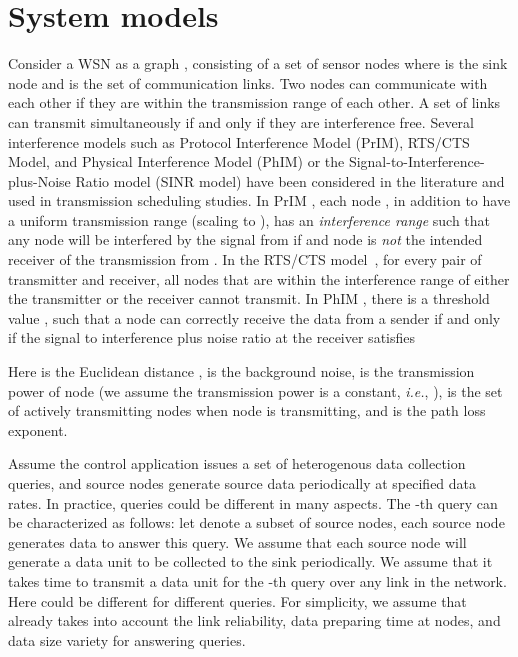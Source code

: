\documentclass[conference,10pt]{IEEEtran}\usepackage{amsmath}
\def\ie{\textit{i.e.}\xspace}
\begin{document}
\section{System models}
\label{sec:model}
Consider a WSN as a graph , consisting of a set  of 
 sensor nodes
 where  is the sink node and  is the set of
 communication links.
Two nodes can communicate with each other {if}
 they are within the transmission range of each other.
A set of links can transmit simultaneously if and only if they are
 interference free.
 Several interference models such as Protocol Interference Model (PrIM),  RTS/CTS Model, and Physical
 Interference Model (PhIM) or the Signal-to-Interference-plus-Noise
 Ratio model (SINR model) have been considered in the literature and used in transmission
scheduling studies.
In PrIM \cite{gupta2000capacity}, each node
 , in addition to have a uniform transmission range (scaling to ),
 has an \textit{interference range}  such that
 any node  will be interfered by the signal from
  if  and node  is \emph{not}
 the intended receiver of the transmission from .
In the RTS/CTS  model~\cite{alicherry2005joint}, for every
 pair of transmitter and receiver,
 all nodes that are within the interference range of either the transmitter
 or the receiver cannot transmit.
In PhIM \cite{goussevskaia2007complexity}, there is a threshold
value ,
 such that a node  can correctly
 receive the data from a sender  if and only if
 the signal to interference plus noise ratio at the receiver satisfies
 
Here
  is the Euclidean distance ,  is the
 background noise,  is the
 transmission power of node  (we assume the transmission power is a
 constant, \ie, ), 
 is the set of actively transmitting nodes when node  is
 transmitting, and  is the path loss exponent.

Assume the control application issues a set
 of heterogenous  data collection queries, and
 source nodes generate source data periodically at specified
 data rates.
 In practice, queries could be different in many aspects.
The -th query can be characterized as follows: let  denote a subset of source nodes, each source node generates data to
answer this query. We assume that each source node 
 will generate a data unit to be
 collected to the sink  periodically.
We assume that it takes  time to transmit a data unit
for the -th query over any link in the network. Here
 could be different for different queries. For
simplicity, we assume that  already takes into
account the link reliability, data preparing time at nodes,  and
data size variety for answering queries.
\end{document}
